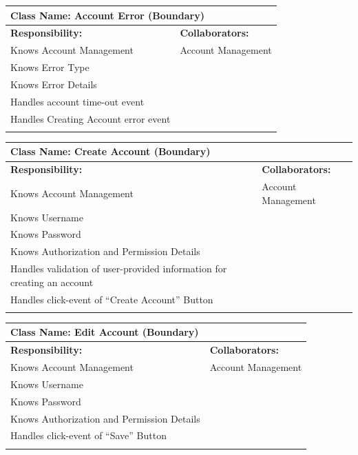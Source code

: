 \documentclass[]{article}
\begin{document}
	\begin{table}[ht]
		\centering
		\begin{tabular}{|p{7cm}|p{7cm}|}
		\hline 
		 \multicolumn{2}{|l|}{\textbf{Class Name:} Account Error (Boundary)} \\
		\hline
		\textbf{Responsibility:} & \textbf{Collaborators:} \\
		\hline
		Knows Account Management & Account Management \\
		Knows Error Type &\\
		Knows Error Details &\\
		Handles account time-out event &\\
		Handles Creating Account error event &\\
		\vspace{0.1in} & \\
		\hline
		\end{tabular}
	\end{table}

	\begin{table}[ht]
		\centering
		\begin{tabular}{|p{7cm}|p{7cm}|}
		\hline 
		 \multicolumn{2}{|l|}{\textbf{Class Name:} Create Account (Boundary)} \\
		\hline
		\textbf{Responsibility:} & \textbf{Collaborators:} \\
		\hline
			Knows Account Management  & Account Management\\
			Knows Username &\\
			Knows Password &\\
			Knows Authorization and Permission Details &\\
			Handles validation of user-provided information for creating an account &\\
			Handles click-event of “Create Account” Button &\\
		\vspace{0.1in} & \\
		\hline
		\end{tabular}
	\end{table}

	\begin{table}[ht]
		\centering
		\begin{tabular}{|p{7cm}|p{7cm}|}
		\hline 
		 \multicolumn{2}{|l|}{\textbf{Class Name:} Edit Account (Boundary)} \\
		\hline
		\textbf{Responsibility:} & \textbf{Collaborators:} \\
		\hline
			Knows Account Management & Account Management\\
			Knows Username &\\
			Knows Password &\\
			Knows Authorization and Permission Details &\\
			Handles click-event of “Save” Button &\\
		\vspace{0.1in} & \\
		\hline
		\end{tabular}
	\end{table}
\end{document}
